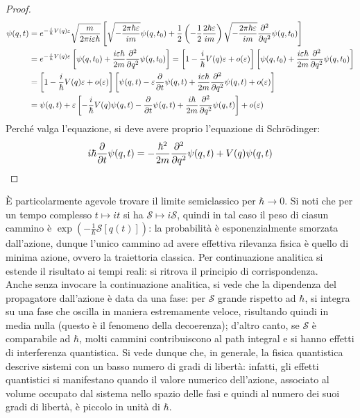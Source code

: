 \begin{proof}
\begin{equation*}
\begin{split}
			\psi(q,t)
			&= e^{-\frac{i}{\hbar} V(q) \varepsilon} \sqrt{\frac{m}{2\pi i \varepsilon \hbar}} \left[ \sqrt{-\frac{2\pi \hbar \varepsilon}{i m}} \psi(q,t_0) + \frac{1}{2} \left( - \frac{1}{2} \frac{2\hbar \varepsilon}{im} \right) \sqrt{- \frac{2\pi\hbar \varepsilon}{im}} \frac{\partial^2}{\partial q^2} \psi(q,t_0) \right] \\
			&= e^{-\frac{i}{\hbar} V(q) \varepsilon} \left[ \psi(q,t_0) + \frac{i \varepsilon \hbar}{2m} \frac{\partial^2}{\partial q^2} \psi(q,t_0) \right] = \left[ 1 - \frac{i}{\hbar} V(q) \varepsilon + o(\varepsilon) \right] \left[ \psi(q,t_0) + \frac{i \varepsilon \hbar}{2m} \frac{\partial^2}{\partial q^2} \psi(q,t_0) \right] \\
			&= \left[ 1 - \frac{i}{\hbar} V(q) \varepsilon + o(\varepsilon) \right] \left[ \psi(q,t) - \varepsilon \frac{\partial}{\partial t} \psi(q,t) + \frac{i \varepsilon \hbar}{2m} \frac{\partial^2}{\partial q^2} \psi(q,t) + o(\varepsilon) \right] \\
			&= \psi(q,t) + \varepsilon \left[ - \frac{i}{\hbar} V(q) \psi(q,t) - \frac{\partial}{\partial t} \psi(q,t) + \frac{i\hbar}{2m} \frac{\partial^2}{\partial q^2} \psi(q,t) \right] + o(\varepsilon)
		\end{split}
	\end{equation*}
	Perché valga l'equazione, si deve avere proprio l'equazione di Schrödinger:
	\begin{equation*}
		i\hbar \frac{\partial}{\partial t} \psi(q,t) = -\frac{\hbar^2}{2m} \frac{\partial^2}{\partial q^2} \psi(q,t) + V(q) \psi(q,t)
	\end{equation*}
\end{proof}

È particolarmente agevole trovare il limite semiclassico per $ \hbar \rightarrow 0 $. Si noti che per un tempo complesso $ t \mapsto it $ si ha $ \mathcal{S} \mapsto i\mathcal{S} $, quindi in tal caso il peso di ciasun cammino è $ \exp\left( - \frac{1}{\hbar} \mathcal{S}[q(t)] \right) $: la probabilità è esponenzialmente smorzata dall'azione, dunque l'unico cammino ad avere effettiva rilevanza fisica è quello di minima azione, ovvero la traiettoria classica. Per continuazione analitica si estende il risultato ai tempi reali: si ritrova il principio di corrispondenza.\\
Anche senza invocare la continuazione analitica, si vede che la dipendenza del propagatore dall'azione è data da una fase: per $ \mathcal{S} $ grande rispetto ad $ \hbar $, si integra su una fase che oscilla in maniera estremamente veloce, risultando quindi in media nulla (questo è il fenomeno della decoerenza); d'altro canto, se $ \mathcal{S} $ è comparabile ad $ \hbar $, molti cammini contribuiscono al path integral e si hanno effetti di interferenza quantistica. Si vede dunque che, in generale, la fisica quantistica descrive sistemi con un basso numero di gradi di libertà: infatti, gli effetti quantistici si manifestano quando il valore numerico dell'azione, associato al volume occupato dal sistema nello spazio delle fasi e quindi al numero dei suoi gradi di libertà, è piccolo in unità di $ \hbar $.

